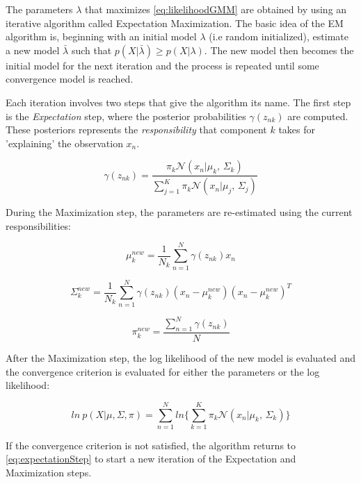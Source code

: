 The parameters $\lambda$ that maximizes \ref{eq:likelihoodGMM} are obtained by using an iterative
algorithm called Expectation Maximization. The basic idea of the EM algorithm is,
beginning with an initial model $\lambda$ (i.e random initialized), estimate a new model
$\bar{\lambda}$ such that $p(X|\bar{\lambda}) \geq p(X|\lambda)$. The new model then becomes
the initial model for the next iteration and the process is repeated until some convergence
model is reached.

Each iteration involves two steps that give the algorithm its name. The first step is the \emph{Expectation} step, where the posterior probabilities $\gamma(z_{nk})$ are computed.
These posteriors represents the \emph{responsibility} that component $k$ takes for
'explaining' the observation $x_{n}$.

\begin{equation}
	\gamma(z_{nk}) = \frac{\pi_{k} \mathcal{N}(x_{n}|\mu_{k},\,\Sigma_{k})}{\sum_{j=1}^{K}\pi_{k} \mathcal{N}(x_{n}|\mu_{j},\,\Sigma_{j})}
	\label{eq:expectationStep}
\end{equation}

During the Maximization step, the parameters are re-estimated using the current responsibilities:

\begin{equation}
	\mu_{k}^{new} = \frac{1}{N_{k}}\sum_{n=1}^{N}\gamma(z_{nk})x_{n}
\end{equation}

\begin{equation}
	\Sigma_{k}^{new} = \frac{1}{N_{k}}\sum_{n=1}^{N}\gamma(z_{nk})(x_{n} - \mu_{k}^{new})(x_{n} - \mu_{k}^{new})^{T}
\end{equation}

\begin{equation}
	\pi_{k}^{new} = \frac{\sum_{n=1}^{N}\gamma(z_{nk})}{N}
\end{equation}

After the Maximization step, the log likelihood of the new model is evaluated and the convergence
criterion is evaluated for either the parameters or the log likelihood:

\begin{equation}
	ln \ p(X|\mu, \Sigma, \pi) = \sum_{n=1}^{N}ln\Big\{\sum_{k=1}^{K}\pi_{k}\mathcal{N}(x_{n}|\mu_{k},\,\Sigma_{k})\Big\}
\end{equation}


If the convergence criterion is not satisfied, the algorithm returns to \ref{eq:expectationStep}
to start a new iteration of the Expectation and Maximization steps.

